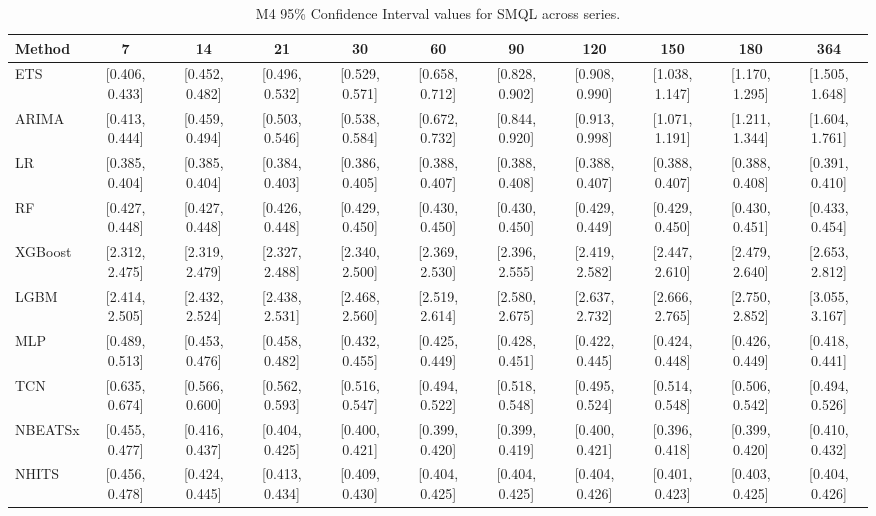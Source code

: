 \begin{table}[!ht]
\centering
\begin{adjustbox}{max width=\textwidth}
\begin{tabular}{lcccccccccc}
\toprule
Method & 7 & 14 & 21 & 30 & 60 & 90 & 120 & 150 & 180 & 364 \\
\midrule
ETS & [0.406, 0.433] & [0.452, 0.482] & [0.496, 0.532] & [0.529, 0.571] & [0.658, 0.712] & [0.828, 0.902] & [0.908, 0.990] & [1.038, 1.147] & [1.170, 1.295] & [1.505, 1.648] \\
ARIMA & [0.413, 0.444] & [0.459, 0.494] & [0.503, 0.546] & [0.538, 0.584] & [0.672, 0.732] & [0.844, 0.920] & [0.913, 0.998] & [1.071, 1.191] & [1.211, 1.344] & [1.604, 1.761] \\
LR & [0.385, 0.404] & [0.385, 0.404] & [0.384, 0.403] & [0.386, 0.405] & [0.388, 0.407] & [0.388, 0.408] & [0.388, 0.407] & [0.388, 0.407] & [0.388, 0.408] & [0.391, 0.410] \\
RF & [0.427, 0.448] & [0.427, 0.448] & [0.426, 0.448] & [0.429, 0.450] & [0.430, 0.450] & [0.430, 0.450] & [0.429, 0.449] & [0.429, 0.450] & [0.430, 0.451] & [0.433, 0.454] \\
XGBoost & [2.312, 2.475] & [2.319, 2.479] & [2.327, 2.488] & [2.340, 2.500] & [2.369, 2.530] & [2.396, 2.555] & [2.419, 2.582] & [2.447, 2.610] & [2.479, 2.640] & [2.653, 2.812] \\
LGBM & [2.414, 2.505] & [2.432, 2.524] & [2.438, 2.531] & [2.468, 2.560] & [2.519, 2.614] & [2.580, 2.675] & [2.637, 2.732] & [2.666, 2.765] & [2.750, 2.852] & [3.055, 3.167] \\
MLP & [0.489, 0.513] & [0.453, 0.476] & [0.458, 0.482] & [0.432, 0.455] & [0.425, 0.449] & [0.428, 0.451] & [0.422, 0.445] & [0.424, 0.448] & [0.426, 0.449] & [0.418, 0.441] \\
TCN & [0.635, 0.674] & [0.566, 0.600] & [0.562, 0.593] & [0.516, 0.547] & [0.494, 0.522] & [0.518, 0.548] & [0.495, 0.524] & [0.514, 0.548] & [0.506, 0.542] & [0.494, 0.526] \\
NBEATSx & [0.455, 0.477] & [0.416, 0.437] & [0.404, 0.425] & [0.400, 0.421] & [0.399, 0.420] & [0.399, 0.419] & [0.400, 0.421] & [0.396, 0.418] & [0.399, 0.420] & [0.410, 0.432] \\
NHITS & [0.456, 0.478] & [0.424, 0.445] & [0.413, 0.434] & [0.409, 0.430] & [0.404, 0.425] & [0.404, 0.425] & [0.404, 0.426] & [0.401, 0.423] & [0.403, 0.425] & [0.404, 0.426] \\
\bottomrule
\end{tabular}
\end{adjustbox}
\caption{M4 95\% Confidence Interval values for SMQL across series.}
\label{tab:ci_m4_scaled_mqloss}
\end{table}

